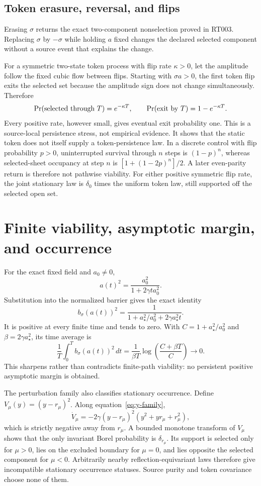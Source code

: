 \documentclass[11pt]{article}
\begin{document}
\subsection{Token erasure, reversal, and flips}

Erasing $\sigma$ returns the exact two-component nonselection proved in RT003.
Replacing $\sigma$ by $-\sigma$ while holding $a$ fixed changes the declared
selected component without a source event that explains the change.

For a symmetric two-state token process with flip rate $\kappa>0$, let the
amplitude follow the fixed cubic flow between flips.  Starting with
$\sigma a>0$, the first token flip exits the selected set because the
amplitude sign does not change simultaneously.  Therefore
\[
 \Pr(\hbox{selected through }T)=e^{-\kappa T},
 \qquad
 \Pr(\hbox{exit by }T)=1-e^{-\kappa T}.
\]
Every positive rate, however small, gives eventual exit probability one.
This is a source-local persistence stress, not empirical evidence.  It shows
that the static token does not itself supply a token-persistence law.
In a discrete control with flip probability $p>0$, uninterrupted survival
through $n$ steps is $(1-p)^n$, whereas selected-sheet occupancy at step $n$
is $[1+(1-2p)^n]/2$.  A later even-parity return is therefore not pathwise
viability.  For either positive symmetric flip rate, the joint stationary law
is $\delta_0$ times the uniform token law, still supported off the selected
open set.

\section{Finite viability, asymptotic margin, and occurrence}

For the exact fixed field and $a_0\neq0$,
\[
 a(t)^2=\frac{a_0^2}{1+2\gamma t a_0^2}.
\]
Substitution into the normalized barrier gives the exact identity
\begin{equation}
 b_\sigma(a(t))^2
 =\frac{1}{1+a_\star^2/a_0^2+2\gamma a_\star^2t}.
 \label{eq:barrier-decay}
\end{equation}
It is positive at every finite time and tends to zero.  With
$C=1+a_\star^2/a_0^2$ and $\beta=2\gamma a_\star^2$, its time average is
\[
 \frac1T\int_0^T b_\sigma(a(t))^2\,dt
 =\frac{1}{\beta T}\log\!\left(\frac{C+\beta T}{C}\right)
 \longrightarrow0.
\]
This sharpens rather than contradicts finite-path viability: no persistent
positive asymptotic margin is obtained.

The perturbation family also classifies stationary occurrence.  Define
$V_\mu(y)=(y-r_\mu)^2$.  Along equation~\eqref{eq:y-family},
\begin{equation}
 \dot V_\mu
 =-2\gamma(y-r_\mu)^2(y^2+yr_\mu+r_\mu^2),
 \label{eq:lyapunov}
\end{equation}
which is strictly negative away from $r_\mu$.  A bounded monotone transform of
$V_\mu$ shows that the only invariant Borel probability is $\delta_{r_\mu}$.
Its support is selected only for $\mu>0$, lies on the excluded boundary for
$\mu=0$, and lies opposite the selected component for $\mu<0$.  Arbitrarily
nearby reflection-equivariant laws therefore give incompatible stationary
occurrence statuses.  Source purity and token covariance choose none of them.
\end{document}
